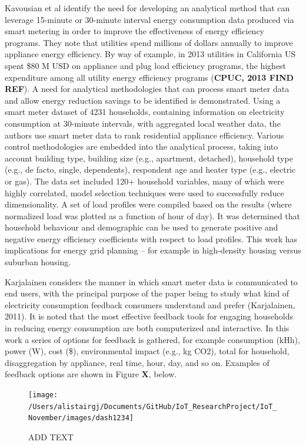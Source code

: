 \documentclass[11pt,]{article}
\begin{document}
Kavousian et al identify the need for developing an analytical method
that can leverage 15-minute or 30-minute interval energy consumption
data produced via smart metering in order to improve the effectiveness
of energy efficiency programs. They note that utilities spend millions
of dollars annually to improve appliance energy efficiency. By way of
example, in 2013 utilities in California US spent \$80 M USD on
appliance and plug load efficiency programs, the highest expenditure
among all utility energy efficiency programs (\textbf{CPUC, 2013 FIND
REF}). A need for analytical methodologies that can process smart meter
data and allow energy reduction savings to be identified is
demonstrated. Using a smart meter dataset of 4231 households, containing
information on electricity consumption at 30-minute intervals, with
aggregated local weather data, the authors use smart meter data to rank
residential appliance efficiency. Various control methodologies are
embedded into the analytical process, taking into account building type,
building size (e.g., apartment, detached), household type (e.g., de
facto, single, dependents), respondent age and heater type (e.g.,
electric or gas). The data set included 120+ household variables, many
of which were highly correlated, model selection techniques were used to
successfully reduce dimensionality. A set of load profiles were compiled
based on the results (where normalized load was plotted as a function of
hour of day). It was determined that household behaviour and demographic
can be used to generate positive and negative energy efficiency
coefficients with respect to load profiles. This work has implications
for energy grid planning -- for example in high-density housing versus
suburban housing.

Karjalainen considers the manner in which smart meter data is
communicated to end users, with the principal purpose of the paper being
to study what kind of electricity consumption feedback consumers
understand and prefer (Karjalainen, 2011). It is noted that the most
effective feedback tools for engaging households in reducing energy
consumption are both computerized and interactive. In this work a series
of options for feedback is gathered, for example consumption (kHh),
power (W), cost (\$), environmental impact (e.g., kg CO2), total for
household, disaggregation by appliance, real time, hour, day, and so on.
Examples of feedback options are shown in Figure \textbf{X}, below.

\begin{figure}[H]

{\centering \texttt{[image: /Users/alistairgj/Documents/GitHub/IoT\_ResearchProject/IoT\_November/images/dash1234]} 

}

\caption{ADD TEXT}\label{fig:unnamed-chunk-4}
\end{figure}
\end{document}
